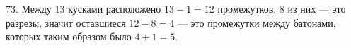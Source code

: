73. Между 13 кусками расположено $13-1=12$ промежутков. 8 из них --- это разрезы, значит оставшиеся $12-8=4$ --- это промежутки между батонами, которых таким образом было $4+1=5.$\\
